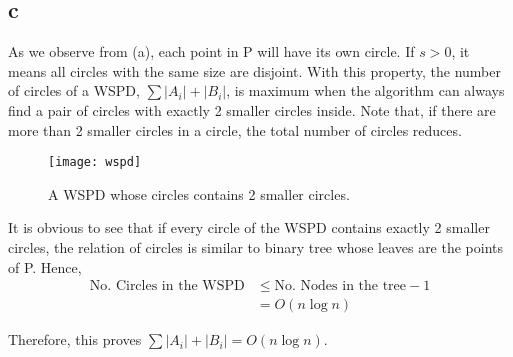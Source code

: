 \subsection*{c}
As we observe from (a), each point in P will have its own circle.
If $s > 0$, it means all circles with the same size are disjoint. With this property,
the number of circles of a WSPD, $\sum{|A_i|+|B_i|}$, is maximum when the algorithm
can always find a pair of circles with exactly 2 smaller circles inside.
Note that, if there are more than 2 smaller circles in a circle, the total number of circles reduces. \\

\begin{center}
    \label{figure1}
    \begin{figure}[h]
    \centering
    \texttt{[image: wspd]}\\
    \caption{A WSPD whose circles contains 2 smaller circles.} \label{fig:wspd}
    \end{figure}
\end{center}

It is obvious to see that if every circle of the WSPD contains exactly 2 smaller circles,
the relation of circles is similar to binary tree whose leaves are the points of P. Hence, \\

\begin{align*}
    \text{No. Circles in the WSPD} &\leq \text{No. Nodes in the tree} - 1 \\
    &= O(n\log{n})
\end{align*}

Therefore, this proves $\sum{|A_i|+|B_i|} = O(n\log{n})$.
